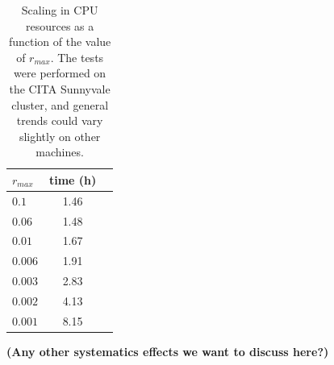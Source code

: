 \begin{table}
\begin{center}
\caption{Scaling in {\small CPU} resources as a function of the value of $r_{max}$. The tests were performed 
on the CITA Sunnyvale cluster, and general trends could vary slightly on other machines.}
\begin{tabular}{|l|c|c|}
\hline 
$r_{max}$         & time (h)   \\                 
\hline
 $0.1$ & 1.46 \\
 $0.06$ & 1.48\\
 $0.01$ & 1.67 \\
 $0.006$ & 1.91\\
 $0.003$ & 2.83 \\
 $0.002$ & 4.13\\
 $0.001$ & 8.15\\
\hline
\end{tabular}
\label{table:ra_max}
\end{center}
\end{table}


{\bf (Any other systematics effects we want to discuss here?)}

 


